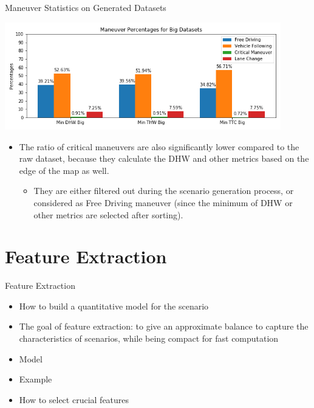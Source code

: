 \documentclass[shortpres]{beamer}
\begin{document}
\begin{frame}{Maneuver Statistics on Generated Datasets}	

\begin{center}
	\includegraphics[width=12cm]{big_datasets_maneuvers}
\end{center}

\begin{itemize}
\fontsize{8pt}{10pt}\selectfont\item The ratio of critical maneuvers are also significantly lower compared to the raw dataset, because they calculate the DHW and other metrics based on the edge of the map as well.
	\begin{itemize} 
		\fontsize{8pt}{10pt}\selectfont\item They are either filtered out during the scenario generation process, or considered as Free Driving maneuver (since the minimum of DHW or other metrics are selected after sorting).
	\end{itemize}
\end{itemize}

\end{frame}

\section{Feature Extraction}	

\begin{frame}{Feature Extraction}	

\begin{itemize} 
\item How to build a quantitative model for the scenario
\vfill \item The goal of feature extraction: to give an approximate balance to capture the characteristics of scenarios, while being compact for fast computation
\vfill \item Model
\vfill \item Example
\vfill \item How to select crucial features
\end{itemize}
\end{frame}
\end{document}
